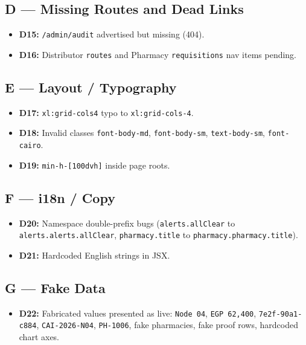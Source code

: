 \documentclass[12pt, a4paper]{article}
\begin{document}
\subsection{D --- Missing Routes and Dead Links}
\begin{itemize}
    \item \textbf{D15:} \texttt{/admin/audit} advertised but missing (404).
    \item \textbf{D16:} Distributor \texttt{routes} and Pharmacy \texttt{requisitions} nav items pending.
\end{itemize}

\subsection{E --- Layout / Typography}
\begin{itemize}
    \item \textbf{D17:} \texttt{xl:grid-cols4} typo to \texttt{xl:grid-cols-4}.
    \item \textbf{D18:} Invalid classes \texttt{font-body-md}, \texttt{font-body-sm}, \texttt{text-body-sm}, \texttt{font-cairo}.
    \item \textbf{D19:} \texttt{min-h-[100dvh]} inside page roots.
\end{itemize}

\subsection{F --- i18n / Copy}
\begin{itemize}
    \item \textbf{D20:} Namespace double-prefix bugs (\texttt{alerts.allClear} to \texttt{alerts.alerts.allClear}, \texttt{pharmacy.title} to \texttt{pharmacy.pharmacy.title}).
    \item \textbf{D21:} Hardcoded English strings in JSX.
\end{itemize}

\subsection{G --- Fake Data}
\begin{itemize}
    \item \textbf{D22:} Fabricated values presented as live: \texttt{Node 04}, \texttt{EGP 62,400}, \texttt{7e2f-90a1-c884}, \texttt{CAI-2026-N04}, \texttt{PH-1006}, fake pharmacies, fake proof rows, hardcoded chart axes.
\end{itemize}
\end{document}
